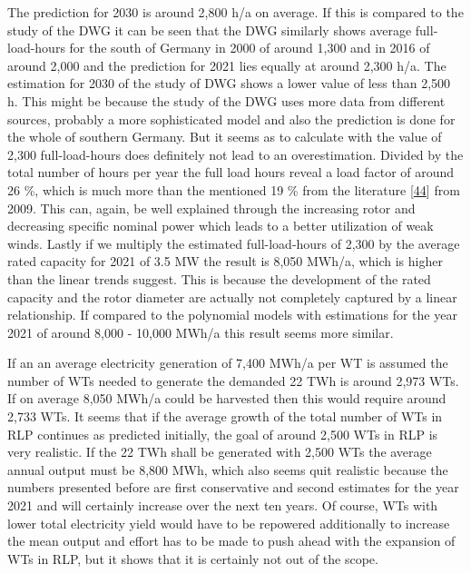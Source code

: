 \documentclass[a4paper,11pt]{article}
\begin{document}
The prediction for 2030 is around 2,800 h/a on average. If this is compared to the study of the DWG it can be seen that the DWG similarly shows average full-load-hours for the south of Germany in 2000 of around 1,300 and in 2016 of around 2,000 and the prediction for 2021 lies equally at around 2,300 h/a. The estimation for 2030 of the study of DWG shows a lower value of less than 2,500 h. This might be because the study of the DWG uses more data from different sources, probably a more sophisticated model and also the prediction is done for the whole of southern Germany. But it seems as to calculate with the value of 2,300 full-load-hours does definitely not lead to an overestimation. Divided by the total number of hours per year the full load hours reveal a load factor of around 26 \%, which is much more than the mentioned 19 \% from the literature {[}\protect\hyperlink{ref-DavidJCMacKay.2009}{44}{]} from 2009. This can, again, be well explained through the increasing rotor and decreasing specific nominal power which leads to a better utilization of weak winds. Lastly if we multiply the estimated full-load-hours of 2,300 by the average rated capacity for 2021 of 3.5 MW the result is 8,050 MWh/a, which is higher than the linear trends suggest. This is because the development of the rated capacity and the rotor diameter are actually not completely captured by a linear relationship. If compared to the polynomial models with estimations for the year 2021 of around 8,000 - 10,000 MWh/a this result seems more similar.

If an an average electricity generation of 7,400 MWh/a per WT is assumed the number of WTs needed to generate the demanded 22 TWh is around 2,973 WTs. If on average 8,050 MWh/a could be harvested then this would require around 2,733 WTs. It seems that if the average growth of the total number of WTs in RLP continues as predicted initially, the goal of around 2,500 WTs in RLP is very realistic. If the 22 TWh shall be generated with 2,500 WTs the average annual output must be 8,800 MWh, which also seems quit realistic because the numbers presented before are first conservative and second estimates for the year 2021 and will certainly increase over the next ten years. Of course, WTs with lower total electricity yield would have to be repowered additionally to increase the mean output and effort has to be made to push ahead with the expansion of WTs in RLP, but it shows that it is certainly not out of the scope.
\end{document}
